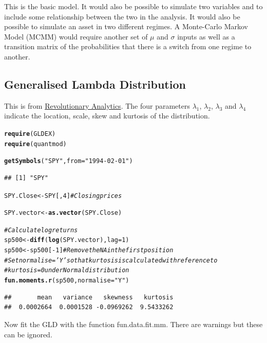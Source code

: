 \documentclass[12pt, a4paper, oneside]{article}\usepackage[]{graphicx}\usepackage[]{color}
\makeatletter
\newcommand{\hlstr}[1]{\textcolor[rgb]{0.192,0.494,0.8}{#1}}%
\newcommand{\hlcom}[1]{\textcolor[rgb]{0.678,0.584,0.686}{\textit{#1}}}%
\newcommand{\hlkwd}[1]{\textcolor[rgb]{0.737,0.353,0.396}{\textbf{#1}}}%
\newenvironment{kframe}{%
 \def\at@end@of@kframe{}%
 \ifinner\ifhmode%
  \def\at@end@of@kframe{\end{minipage}}%
  \begin{minipage}{\columnwidth}%
 \fi\fi%
 \def\FrameCommand##1{\hskip\@totalleftmargin \hskip-\fboxsep
 \colorbox{shadecolor}{##1}\hskip-\fboxsep
     \hskip-\linewidth \hskip-\@totalleftmargin \hskip\columnwidth}%
 \MakeFramed {\advance\hsize-\width
   \@totalleftmargin\z@ \linewidth\hsize
   \@setminipage}}%
 {\par\unskip\endMakeFramed%
 \at@end@of@kframe}
\newenvironment{knitrout}{}{} %
\makeatother
\begin{document}
This is the basic model.  It would also be possible to simulate two variables and to include some relationship between the two in the analysis.  It would also be possible to simulate an asset in two different regimes. A Monte-Carlo Markov Model (MCMM) would require another set of $\mu$ and $\sigma$ inputs as well as a transition matrix of the probabilities that there is a switch from one regime to another. 
 
\subsection{Generalised Lambda Distribution}
This is from \href{http://blog.revolutionanalytics.com/2014/02/quantitative-finance-applications-in-r-4-using-the-generalized-lambda-distribution-to-simulate-market-returns.html}{Revolutionary Analytics}.  The four parameters $\lambda_1$, $\lambda_2$, $\lambda_3$ and $\lambda_4$ indicate the location, scale, skew and kurtosis of the distribution. 

\begin{knitrout}
\color{fgcolor}\begin{kframe}
\begin{alltt}
\hlkwd{require}(GLDEX)
\hlkwd{require}(quantmod)

\hlkwd{getSymbols}(\hlstr{"SPY"}, from = \hlstr{"1994-02-01"})
\end{alltt}
\begin{verbatim}
## [1] "SPY"
\end{verbatim}
\begin{alltt}
SPY.Close <- SPY[, 4]  \hlcom{# Closing prices}

SPY.vector <- \hlkwd{as.vector}(SPY.Close)

\hlcom{# Calculate log returns}
sp500 <- \hlkwd{diff}(\hlkwd{log}(SPY.vector), lag = 1)
sp500 <- sp500[-1]  \hlcom{# Remove the NA in the first position}
\hlcom{# Set normalise='Y' so that kurtosis is calculated with reference to}
\hlcom{# kurtosis = 0 under Normal distribution}
\hlkwd{fun.moments.r}(sp500, normalise = \hlstr{"Y"})
\end{alltt}
\begin{verbatim}
##       mean   variance   skewness   kurtosis 
##  0.0002664  0.0001528 -0.0969262  9.5433262
\end{verbatim}
\end{kframe}
\end{knitrout}

Now fit the GLD with the function fun.data.fit.mm. There are warnings but these can be ignored. 
\end{document}
